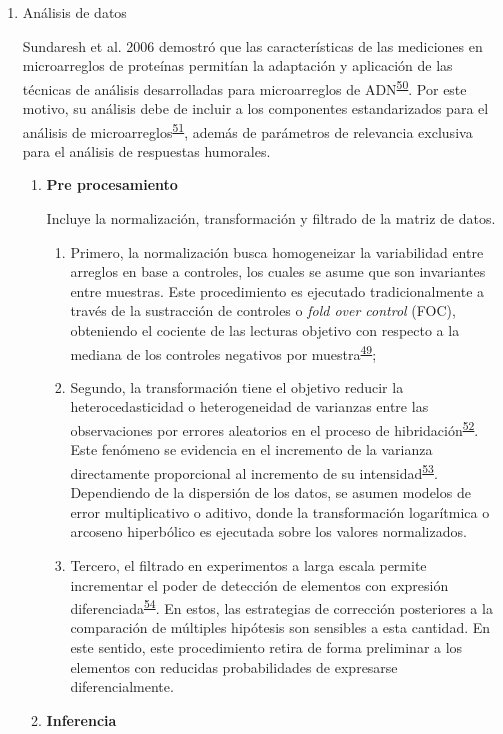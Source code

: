 \documentclass[a4paper]{article}
\providecommand{\tightlist}{%
  \setlength{\itemsep}{0pt}\setlength{\parskip}{0pt}}
\begin{document}
\begin{enumerate}
\def\labelenumi{\alph{enumi}.}
\setcounter{enumi}{1}
\item
  Análisis de datos

  Sundaresh et al. 2006 demostró que las características de las
  mediciones en microarreglos de proteínas permitían la adaptación y
  aplicación de las técnicas de análisis desarrolladas para
  microarreglos de
  ADN\textsuperscript{\protect\hyperlink{ref-sundaresh2006}{50}}. Por
  este motivo, su análisis debe de incluir a los componentes
  estandarizados para el análisis de
  microarreglos\textsuperscript{\protect\hyperlink{ref-allison2006}{51}},
  además de parámetros de relevancia exclusiva para el análisis de
  respuestas humorales.

  \begin{enumerate}
  \def\labelenumii{\roman{enumii}.}
  \item
    \textbf{Pre procesamiento}

    Incluye la normalización, transformación y filtrado de la matriz de
    datos.

    \begin{enumerate}
    \def\labelenumiii{\arabic{enumiii}.}
    \tightlist
    \item
      Primero, la normalización busca homogeneizar la variabilidad entre
      arreglos en base a controles, los cuales se asume que son
      invariantes entre muestras. Este procedimiento es ejecutado
      tradicionalmente a través de la sustracción de controles o
      \emph{fold over control} (FOC), obteniendo el cociente de las
      lecturas objetivo con respecto a la mediana de los controles
      negativos por
      muestra\textsuperscript{\protect\hyperlink{ref-King2015FOC}{49}}; 
    \item
      Segundo, la transformación tiene el objetivo reducir la
      heterocedasticidad o heterogeneidad de varianzas entre las
      observaciones por errores aleatorios en el proceso de
      hibridación\textsuperscript{\protect\hyperlink{ref-kreil2005bullet}{52}}.
      Este fenómeno se evidencia en el incremento de la varianza
      directamente proporcional al incremento de su
      intensidad\textsuperscript{\protect\hyperlink{ref-brown2001image}{53}}.
      Dependiendo de la dispersión de los datos, se asumen modelos de
      error multiplicativo o aditivo, donde la transformación
      logarítmica o arcoseno hiperbólico es ejecutada sobre los valores
      normalizados. 
    \item
      Tercero, el filtrado en experimentos a larga escala permite
      incrementar el poder de detección de elementos con expresión
      diferenciada\textsuperscript{\protect\hyperlink{ref-bourgon2010filter}{54}}.
      En estos, las estrategias de corrección posteriores a la
      comparación de múltiples hipótesis son sensibles a esta cantidad.
      En este sentido, este procedimiento retira de forma preliminar a
      los elementos con reducidas probabilidades de expresarse
      diferencialmente.
    \end{enumerate}
  \item
    \textbf{Inferencia}


\end{enumerate}
\end{enumerate}
\end{document}
